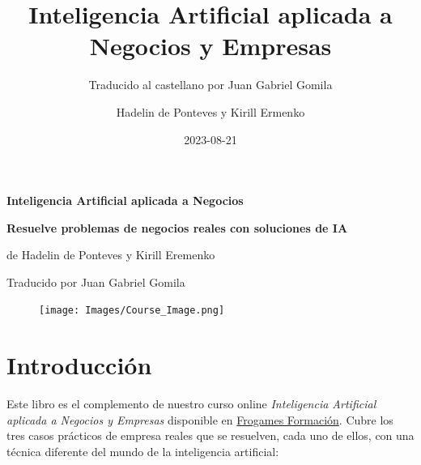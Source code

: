 \documentclass[
]{book}
\title{Inteligencia Artificial aplicada a Negocios y Empresas}
\subtitle{Traducido al castellano por Juan Gabriel Gomila}
\author{Hadelin de Ponteves y Kirill Ermenko}
\date{2023-08-21}
\begin{document}
\maketitle


\begin{titlepage}

\begin{center}

\Huge \textbf{Inteligencia Artificial aplicada a Negocios}

\Large \textbf{Resuelve problemas de negocios reales con soluciones de IA}

\large de Hadelin de Ponteves y Kirill Eremenko

\large Traducido por Juan Gabriel Gomila


\end{center}

\begin{figure}[!htbp]
		\begin{center}
			\texttt{[image: Images/Course\_Image.png]}
		\end{center}
\end{figure}

\end{titlepage}

{
\setcounter{tocdepth}{1}
\tableofcontents
}
\hypertarget{introducciuxf3n}{%
\chapter*{Introducción}\label{introducciuxf3n}}

Este libro es el complemento de nuestro curso online \emph{Inteligencia Artificial aplicada a Negocios y Empresas} disponible en \href{https://cursos.frogamesformacion.com/courses/ia-aplicada-negocios?coupon=frogames30}{Frogames Formación}. Cubre los tres casos prácticos de empresa reales que se resuelven, cada uno de ellos, con una técnica diferente del mundo de la inteligencia artificial:
\end{document}

